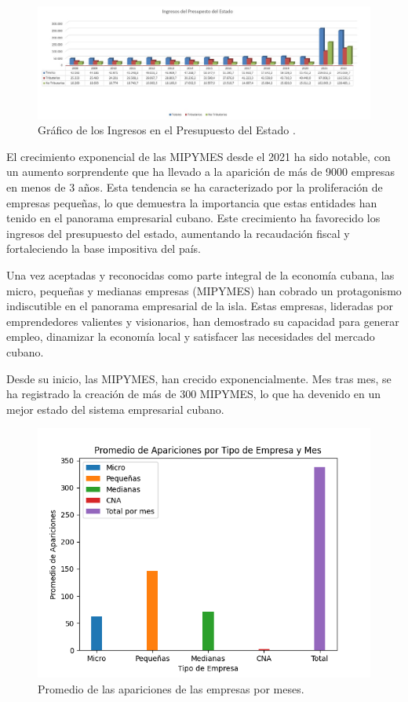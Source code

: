 \documentclass{article}
\begin{document}
\begin{figure}[h]
	\centering
	\includegraphics[width=1.0\textwidth]{Ingresos.jpg}
	\caption{Gráfico de los Ingresos en el Presupuesto del Estado .}
	\label{fig:mi_imagen}
\end{figure}


\newpage

El crecimiento exponencial de las MIPYMES desde el 2021 ha sido notable, con un aumento sorprendente que ha llevado a la aparición de más de 9000 empresas en menos de 3 años. Esta tendencia se ha caracterizado por la proliferación de empresas pequeñas, lo que demuestra la importancia que estas entidades han tenido en el panorama empresarial cubano. Este crecimiento ha favorecido los ingresos del presupuesto del estado, aumentando la recaudación fiscal y  fortaleciendo la base impositiva del país.

Una vez aceptadas y reconocidas como parte integral de la economía cubana, las micro, pequeñas y medianas empresas (MIPYMES) han cobrado un protagonismo indiscutible en el panorama empresarial de la isla. Estas empresas, lideradas por emprendedores valientes y visionarios, han demostrado su capacidad para generar empleo, dinamizar la economía local y satisfacer las necesidades del mercado cubano.

Desde su inicio, las MIPYMES, han crecido exponencialmente. Mes tras mes, se ha registrado la creación de más de 300 MIPYMES, lo que ha devenido en un mejor estado del sistema empresarial cubano.


\begin{figure}[h]
	\centering
	\includegraphics[width=1.0\textwidth]{Apariciones promedio.png}
	\caption{Promedio de las apariciones de las empresas por meses.}
	\label{fig:mi_imagen}
\end{figure}
\end{document}

